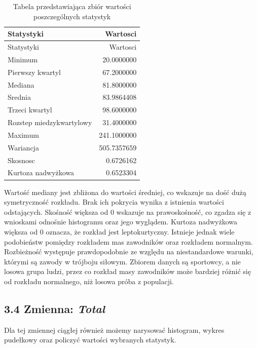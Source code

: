\documentclass[
  letterpaper,
  DIV=11,
  numbers=noendperiod]{scrartcl}
\begin{document}
\begin{longtable}[]{@{}lr@{}}
\caption{Tabela przedstawiająca zbiór wartości poszczególnych statystyk
}\tabularnewline
\toprule\noalign{}
Statystyki & Wartosci \\
\midrule\noalign{}
\endfirsthead
\toprule\noalign{}
Statystyki & Wartosci \\
\midrule\noalign{}
\endhead
\bottomrule\noalign{}
\endlastfoot
Minimum & 20.0000000 \\
Pierwszy kwartyl & 67.2000000 \\
Mediana & 81.8000000 \\
Srednia & 83.9864408 \\
Trzeci kwartyl & 98.6000000 \\
Rozstep miedzykwartylowy & 31.4000000 \\
Maximum & 241.1000000 \\
Wariancja & 505.7357659 \\
Skosnosc & 0.6726162 \\
Kurtoza nadwyżkowa & 0.6523304 \\
\end{longtable}

Wartość mediany jest zbliżona do wartości średniej, co wskazuje na dość
dużą symetryczność rozkładu. Brak ich pokrycia wynika z istnienia
wartości odstających. Skośność większa od 0 wskazuje na prawoskośność,
co zgadza się z wnioskami odnośnie histogramu oraz jego wyglądem.
Kurtoza nadwyżkowa większa od 0 oznacza, że rozkład jest leptokurtyczny.
Istnieje jednak wiele podobieństw pomiędzy rozkładem mas zawodników oraz
rozkładem normalnym. Rozbieżność występuje prawdopodobnie ze względu na
niestandardowe warunki, którymi są zawody w trójboju siłowym. Zbiorem
danych są sportowcy, a nie losowa grupa ludzi, przez co rozkład masy
zawodników może bardziej różnić się od rozkładu normalnego, niż losowa
próba z populacji.

\hypertarget{zmienna-total}{%
\subsection{\texorpdfstring{3.4 Zmienna:
\emph{Total}}{3.4 Zmienna: Total}}\label{zmienna-total}}

Dla tej zmiennej ciągłej również możemy narysować histogram, wykres
pudełkowy oraz policzyć wartości wybranych statystyk.
\end{document}
